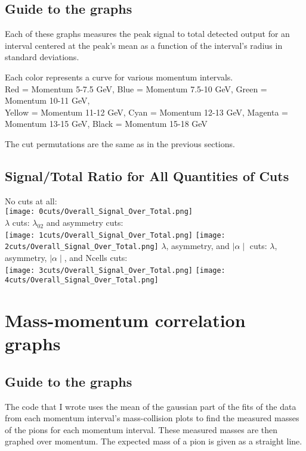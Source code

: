 \documentclass[11pt]{article}
\begin{document}
\subsection{Guide to the graphs} %
Each of these graphs measures the peak signal to total detected output for an interval centered at the peak's mean as a function of the interval's radius in standard deviations.

Each color represents a curve for various momentum intervals.\\
Red = Momentum 5-7.5 GeV, Blue = Momentum 7.5-10 GeV, Green = Momentum 10-11 GeV, \\
Yellow = Momentum 11-12 GeV, Cyan = Momentum 12-13 GeV, Magenta = Momentum 13-15 GeV, Black =  Momentum 15-18 GeV

The cut permutations are the same as in the previous sections.

\subsection{Signal/Total Ratio for All Quantities of Cuts} %
\begin{frame}{}
No cuts at all:\\
\texttt{[image: 0cuts/Overall\_Signal\_Over\_Total.png]}\\
$\lambda$ cuts: 
\noindent\hspace{3 cm} $\lambda_{02}$ and asymmetry cuts: \\
\texttt{[image: 1cuts/Overall\_Signal\_Over\_Total.png]}
\texttt{[image: 2cuts/Overall\_Signal\_Over\_Total.png]}
$\lambda$, asymmetry, and $\mid\alpha\mid$ cuts:
\noindent\hspace{4 cm} $\lambda$, asymmetry, $\mid\alpha\mid$, and Ncells cuts:\\
\texttt{[image: 3cuts/Overall\_Signal\_Over\_Total.png]}
\texttt{[image: 4cuts/Overall\_Signal\_Over\_Total.png]}
\end{frame}

\section{Mass-momentum correlation graphs} 
\subsection{Guide to the graphs} %
The code that I wrote uses the mean of the gaussian part of the fits of the data from each momentum interval's mass-collision plots to find the measured masses of the pions for each momentum interval. These measured masses are then graphed over momentum. The expected mass of a pion is given as a straight line.
\end{document}
